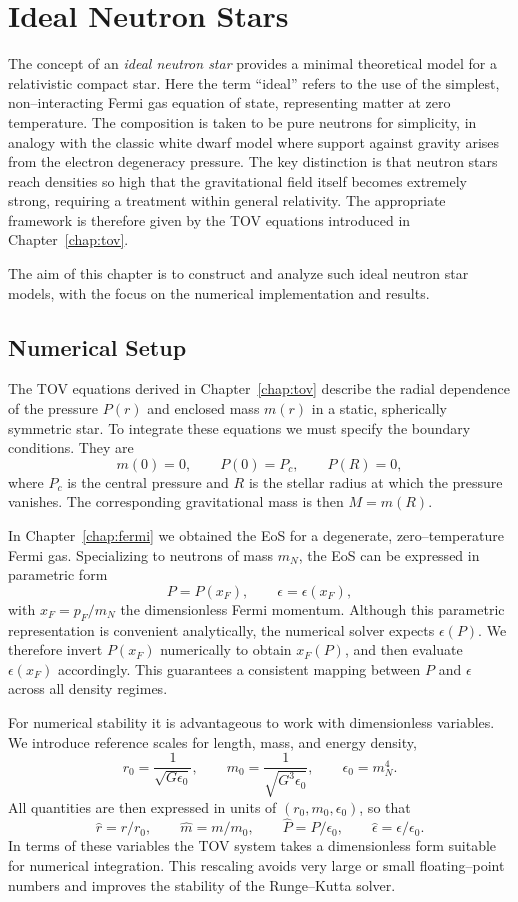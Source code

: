 \chapter{Ideal Neutron Stars}
\label{chap:ideal_neutron_stars}

The concept of an \emph{ideal neutron star} provides a minimal
theoretical model for a relativistic compact star.
Here the term ``ideal'' refers to the use of the simplest, non--interacting
Fermi gas equation of state, representing matter at zero temperature.
The composition is taken to be pure neutrons for simplicity,
in analogy with the classic white dwarf model where support against
gravity arises from the electron degeneracy pressure.
The key distinction is that neutron stars reach densities so high
that the gravitational field itself becomes extremely strong,
requiring a treatment within general relativity.
The appropriate framework is therefore given by the TOV equations
introduced in Chapter~\ref{chap:tov}.

The aim of this chapter is to construct and analyze such ideal neutron
star models, with the focus on the numerical implementation and results.

\section{Numerical Setup}

The TOV equations derived in Chapter~\ref{chap:tov} describe the
radial dependence of the pressure $P(r)$ and enclosed mass $m(r)$ in a
static, spherically symmetric star. To integrate these equations we
must specify the boundary conditions. They are
\[
m(0)=0, \qquad P(0)=P_c, \qquad P(R)=0,
\]
where $P_c$ is the central pressure and $R$ is the stellar radius at
which the pressure vanishes. The corresponding gravitational mass is
then $M=m(R)$.

In Chapter~\ref{chap:fermi} we obtained the EoS for a degenerate,
zero--temperature Fermi gas. Specializing to neutrons of mass $m_N$,
the EoS can be expressed in parametric form
\[
P = P(x_F), \qquad \epsilon = \epsilon(x_F),
\]
with $x_F=p_F/m_N$ the dimensionless Fermi momentum.
Although this parametric representation is convenient analytically,
the numerical solver expects $\epsilon(P)$. We therefore invert
$P(x_F)$ numerically to obtain $x_F(P)$, and then evaluate
$\epsilon(x_F)$ accordingly. This guarantees a consistent mapping
between $P$ and $\epsilon$ across all density regimes.

For numerical stability it is advantageous to work with dimensionless
variables. We introduce reference scales for length, mass, and energy
density,
\[
r_0 = \frac{1}{\sqrt{G \epsilon_0}}, \qquad
m_0 = \frac{1}{\sqrt{G^3 \epsilon_0}}, \qquad
\epsilon_0 = m_N^4.
\]
All quantities are then expressed in units of $(r_0, m_0, \epsilon_0)$,
so that
\[
\hat r = r/r_0, \qquad
\hat m = m/m_0, \qquad
\hat P = P/\epsilon_0, \qquad
\hat \epsilon = \epsilon/\epsilon_0.
\]
In terms of these variables the TOV system takes a dimensionless form
suitable for numerical integration. This rescaling avoids very large
or small floating--point numbers and improves the stability of the
Runge--Kutta solver.


